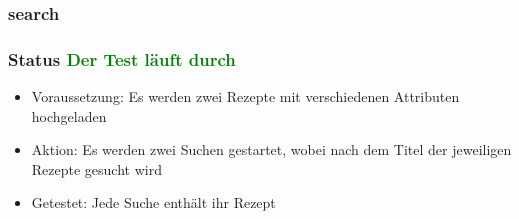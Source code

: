 \subsubsection{search}
\subsubsection{Status \textcolor{green}{ Der Test läuft durch} }
\begin{itemize}
	\item Voraussetzung: Es werden zwei Rezepte mit verschiedenen Attributen hochgeladen
	\item Aktion: Es werden zwei Suchen gestartet, wobei nach dem Titel der jeweiligen Rezepte gesucht wird
	\item Getestet: Jede Suche enthält ihr Rezept
\end{itemize}